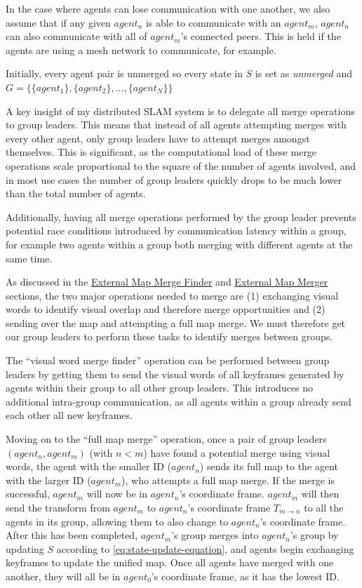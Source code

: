 In the case where agents can lose communication with one another, we also assume that if any given $agent_n$ is able to communicate with an $agent_m$, $agent_n$ can also communicate with all of $agent_m$'s connected peers. This is held if the agents are using a mesh network to communicate, for example.

Initially, every agent pair is unmerged so every state in $S$ is set as \textit{unmerged} and $G=\{\{agent_1\}, \{agent_2\}, ..., \{agent_N\}\}$

A key insight of my distributed SLAM system is to delegate all merge operations to group leaders. This means that instead of all agents attempting merges with every other agent, only group leaders have to attempt merges amongst themselves. This is significant, as the computational load of these merge operations scale proportional to the square of the number of agents involved, and in most use cases the number of group leaders quickly drops to be much lower than the total number of agents.

Additionally, having all merge operations performed by the group leader prevents potential race conditions introduced by communication latency within a group, for example two agents within a group both merging with different agents at the same time.

As discussed in the \hyperref[sec:external-map-merge-finder]{External Map Merge Finder} and \hyperref[sec:external-map-merger]{External Map Merger} sections, the two major operations needed to merge are (1) exchanging visual words to identify visual overlap and therefore merge opportunities and (2) sending over the map and attempting a full map merge. We must therefore get our group leaders to perform these tasks to identify merges between groups.

The ``visual word merge finder'' operation can be performed between group leaders by getting them to send the visual words of all keyframes generated by agents within their group to all other group leaders. This introduces no additional intra-group communication, as all agents within a group already send each other all new keyframes.

Moving on to the ``full map merge'' operation, once a pair of group leaders $(agent_n, agent_m)$ (with $n<m$) have found a potential merge using visual words, the agent with the smaller ID ($agent_n$) sends its full map to the agent with the larger ID ($agent_m$), who attempts a full map merge. If the merge is successful, $agent_m$ will now be in $agent_n$'s coordinate frame. $agent_m$ will then send the transform from $agent_m$ to $agent_n$'s coordinate frame $T_{m \to n}$ to all the agents in its group, allowing them to also change to $agent_n$'s coordinate frame. After this has been completed, $agent_m$'s group merges into $agent_n$'s group by updating $S$ according to \autoref{eq:state-update-equation}, and agents begin exchanging keyframes to update the unified map. Once all agents have merged with one another, they will all be in $agent_0$'s coordinate frame, as it has the lowest ID.

